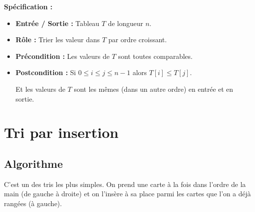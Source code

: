 \medskip

{\bfseries Spécification :} 


\begin{itemize}
	\item {\bfseries Entrée / Sortie :} Tableau $T$ de longueur $n$.
	\item {\bfseries Rôle :} Trier les valeur dans $T$ par ordre croissant.
	\item {\bfseries Précondition :} Les valeurs de $T$ sont toutes comparables.
	\item {\bfseries Postcondition :} Si $0 \leqslant i\leqslant j \leqslant n-1$ alors $T[i]\leqslant T[j]$.
	
	Et les valeurs de $T$ sont les mêmes (dans un autre ordre) en entrée et en sortie.
\end{itemize}

\section{Tri par insertion}

\subsection{Algorithme}

C'est un des tris les plus simples. On prend une carte à la fois dans l'ordre de la main (de gauche à droite) et on l'insère à sa place parmi les cartes que l'on a déjà rangées (à gauche).

